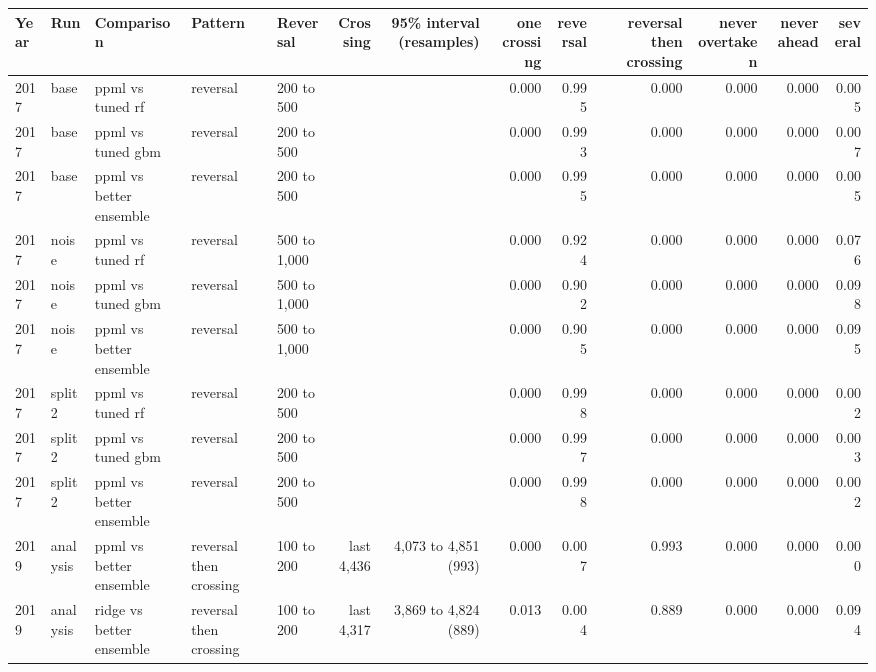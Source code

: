 \begin{tabular}{lllllrrrrrrrr}
\toprule
Year & Run & Comparison & Pattern & Reversal & Crossing & 95\% interval (resamples) & one crossing & reversal & reversal then crossing & never overtaken & never ahead & several \\
\midrule
2017 & base & ppml vs tuned rf & reversal & 200 to 500 &  &  & 0.000 & 0.995 & 0.000 & 0.000 & 0.000 & 0.005 \\
2017 & base & ppml vs tuned gbm & reversal & 200 to 500 &  &  & 0.000 & 0.993 & 0.000 & 0.000 & 0.000 & 0.007 \\
2017 & base & ppml vs better ensemble & reversal & 200 to 500 &  &  & 0.000 & 0.995 & 0.000 & 0.000 & 0.000 & 0.005 \\
2017 & noise & ppml vs tuned rf & reversal & 500 to 1,000 &  &  & 0.000 & 0.924 & 0.000 & 0.000 & 0.000 & 0.076 \\
2017 & noise & ppml vs tuned gbm & reversal & 500 to 1,000 &  &  & 0.000 & 0.902 & 0.000 & 0.000 & 0.000 & 0.098 \\
2017 & noise & ppml vs better ensemble & reversal & 500 to 1,000 &  &  & 0.000 & 0.905 & 0.000 & 0.000 & 0.000 & 0.095 \\
2017 & split2 & ppml vs tuned rf & reversal & 200 to 500 &  &  & 0.000 & 0.998 & 0.000 & 0.000 & 0.000 & 0.002 \\
2017 & split2 & ppml vs tuned gbm & reversal & 200 to 500 &  &  & 0.000 & 0.997 & 0.000 & 0.000 & 0.000 & 0.003 \\
2017 & split2 & ppml vs better ensemble & reversal & 200 to 500 &  &  & 0.000 & 0.998 & 0.000 & 0.000 & 0.000 & 0.002 \\
2019 & analysis & ppml vs better ensemble & reversal then crossing & 100 to 200 & last 4,436 & 4,073 to 4,851 (993) & 0.000 & 0.007 & 0.993 & 0.000 & 0.000 & 0.000 \\
2019 & analysis & ridge vs better ensemble & reversal then crossing & 100 to 200 & last 4,317 & 3,869 to 4,824 (889) & 0.013 & 0.004 & 0.889 & 0.000 & 0.000 & 0.094 \\
\bottomrule
\end{tabular}
